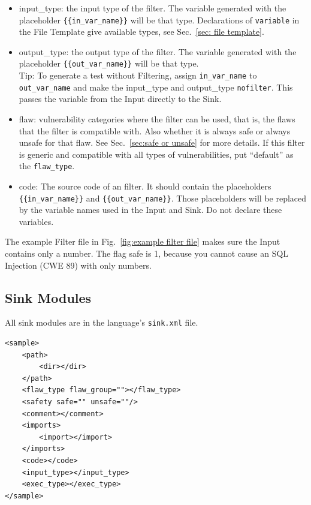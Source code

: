 \documentclass[12pt]{article}
\begin{document}
\begin{itemize}
    \item input\_type: the input type of the filter. The variable 
    generated with
    the placeholder \verb|{{in_var_name}}| will be that type.
    Declarations of \verb|variable| in the File Template give
    available types, see Sec.~\ref{sec: file template}.

    \item output\_type: the output type of the filter.  The variable generated
    with the placeholder \verb|{{out_var_name}}| will be that type. \\
    Tip: To generate a test without Filtering, assign \verb|in_var_name| to
    \verb|out_var_name| and make the input\_type and output\_type \verb|nofilter|.
    This passes the variable from the Input directly to the Sink.

    \item flaw: vulnerability categories where the filter can be used, that is, the
      flaws that the filter is compatible with.  Also whether it is always safe or
      always unsafe for that flaw.  See Sec.~\ref{sec:safe or unsafe}
      for more details.  If this filter is generic and compatible with all
      types of vulnerabilities, put ``default'' as the \verb|flaw_type|.

    \item code: The source code of an filter. It should contain the placeholders
    \\
    \verb|{{in_var_name}}| and \verb|{{out_var_name}}|.  Those placeholders will 
    be replaced by the variable names used in the Input and Sink.  Do not declare 
    these variables.
\end{itemize}

The example Filter file in Fig.~\ref{fig:example filter file} makes sure
the Input contains only a number.  
The flag safe is 1, because you cannot cause an SQL Injection 
(CWE 89) with only numbers.


\subsection{Sink Modules}
\label{sec:sink modules}

All sink modules are in the language's \verb|sink.xml| file.

\begin{verbatim}
<sample>
    <path>
        <dir></dir>
    </path>
    <flaw_type flaw_group=""></flaw_type>
    <safety safe="" unsafe=""/>
    <comment></comment>
    <imports>
        <import></import>
    </imports>
    <code></code>
    <input_type></input_type>
    <exec_type></exec_type>
</sample>
\end{verbatim}
\end{document}
